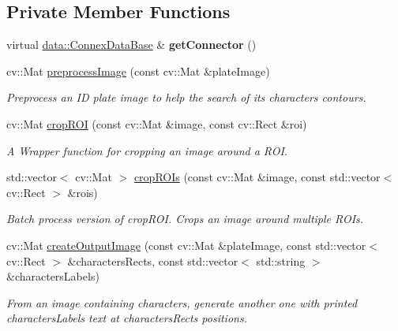 \subsection*{Private Member Functions}
\begin{DoxyCompactItemize}
\item 
\mbox{\label{classfilter_1_1_algos_1_1_i_d_plate_identifier_ae424cce182cf0d5dd65e0f4480da3936}} 
virtual \hyperlink{classfilter_1_1data_1_1_connex_data_base}{data\+::\+Connex\+Data\+Base} \& {\bfseries get\+Connector} ()
\item 
cv\+::\+Mat \hyperlink{classfilter_1_1_algos_1_1_i_d_plate_identifier_a4ce2afa02689d7047310c64907cc40a4}{preprocess\+Image} (const cv\+::\+Mat \&plate\+Image)
\begin{DoxyCompactList}\small\item\em Preprocess an ID plate image to help the search of its characters contours. \end{DoxyCompactList}\item 
cv\+::\+Mat \hyperlink{classfilter_1_1_algos_1_1_i_d_plate_identifier_a9c438d1ec3c38527ab5a6faf925971b3}{crop\+R\+OI} (const cv\+::\+Mat \&image, const cv\+::\+Rect \&roi)
\begin{DoxyCompactList}\small\item\em A Wrapper function for cropping an image around a R\+OI. \end{DoxyCompactList}\item 
std\+::vector$<$ cv\+::\+Mat $>$ \hyperlink{classfilter_1_1_algos_1_1_i_d_plate_identifier_aa5e8c02fc1fc20cacaa1cc45610307e1}{crop\+R\+O\+Is} (const cv\+::\+Mat \&image, const std\+::vector$<$ cv\+::\+Rect $>$ \&rois)
\begin{DoxyCompactList}\small\item\em Batch process version of crop\+R\+OI. Crops an image around multiple R\+O\+Is. \end{DoxyCompactList}\item 
cv\+::\+Mat \hyperlink{classfilter_1_1_algos_1_1_i_d_plate_identifier_a954615df7d4060998e69fda73fa9a416}{create\+Output\+Image} (const cv\+::\+Mat \&plate\+Image, const std\+::vector$<$ cv\+::\+Rect $>$ \&characters\+Rects, const std\+::vector$<$ std\+::string $>$ \&characters\+Labels)
\begin{DoxyCompactList}\small\item\em From an image containing characters, generate another one with printed characters\+Labels text at characters\+Rects positions. \end{DoxyCompactList}\end{DoxyCompactItemize}
